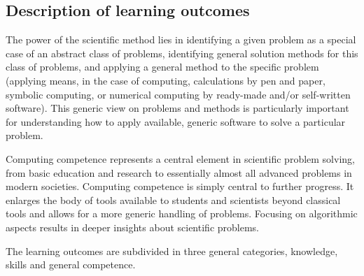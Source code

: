 \documentclass{article}
\begin{document}
\subsection{Description of learning outcomes}

The power of the scientific method lies in identifying a given problem
as a special case of an abstract class of problems, identifying
general solution methods for this class of problems, and applying a
general method to the specific problem (applying means, in the case of
computing, calculations by pen and paper, symbolic computing, or
numerical computing by ready-made and/or self-written software). This
generic view on problems and methods is particularly important for
understanding how to apply available, generic software to solve a
particular problem.


Computing competence represents a central element
in scientific problem solving, from basic education and research to
essentially almost all advanced problems in modern
societies. Computing competence is simply central to further
progress. It enlarges the body of tools available to students and
scientists beyond classical tools and allows for a more generic
handling of problems. Focusing on algorithmic aspects results in
deeper insights about scientific problems.

The learning outcomes are subdivided in three general categories, knowledge, skills and general competence.
\end{document}
